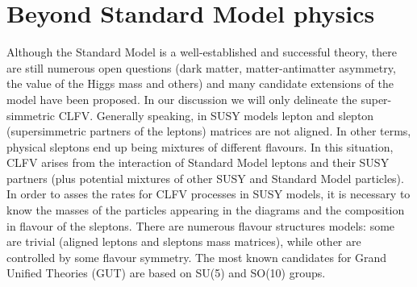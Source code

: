 \documentclass[12pt,a4paper,openright, oneside, titlepage]{book} %
\begin{document}
\section{Beyond Standard Model physics}
Although the Standard Model is a well-established and successful theory, 
there are still numerous open questions 
(dark matter, matter-antimatter asymmetry, 
the value of the Higgs mass and others) 
and many candidate extensions of the model have been proposed.
In our discussion we will only delineate the super-simmetric CLFV.
Generally speaking, in SUSY models lepton and slepton 
(supersimmetric partners of the leptons) matrices are not aligned. 
In other terms, physical sleptons end up being mixtures of different flavours. 
In this situation, CLFV arises from the interaction of Standard Model leptons and their SUSY partners 
(plus potential mixtures of other SUSY and Standard Model particles). 
In order to asses the rates for CLFV processes in SUSY models, 
it is necessary to know the masses of the particles appearing in the diagrams and the composition in flavour of the sleptons.
There are numerous flavour structures models: some are trivial (aligned leptons and sleptons mass matrices), 
while other are controlled by some flavour symmetry. 
The most known candidates for Grand Unified Theories (GUT) are based on SU(5) and SO(10) groups.
\end{document}
